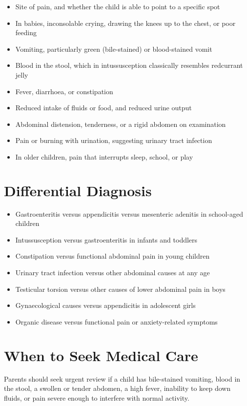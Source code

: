 \begin{itemize}
    \item Site of pain, and whether the child is able to point to a specific spot
    \item In babies, inconsolable crying, drawing the knees up to the chest, or poor feeding
    \item Vomiting, particularly green (bile-stained) or blood-stained vomit
    \item Blood in the stool, which in intussusception classically resembles redcurrant jelly
    \item Fever, diarrhoea, or constipation
    \item Reduced intake of fluids or food, and reduced urine output
    \item Abdominal distension, tenderness, or a rigid abdomen on examination
    \item Pain or burning with urination, suggesting urinary tract infection
    \item In older children, pain that interrupts sleep, school, or play
\end{itemize}

\section*{Differential Diagnosis}
\begin{itemize}
    \item Gastroenteritis versus appendicitis versus mesenteric adenitis in school-aged children
    \item Intussusception versus gastroenteritis in infants and toddlers
    \item Constipation versus functional abdominal pain in young children
    \item Urinary tract infection versus other abdominal causes at any age
    \item Testicular torsion versus other causes of lower abdominal pain in boys
    \item Gynaecological causes versus appendicitis in adolescent girls
    \item Organic disease versus functional pain or anxiety-related symptoms
\end{itemize}

\section*{When to Seek Medical Care}
Parents should seek urgent review if a child has bile-stained vomiting, blood in the stool, a swollen or tender abdomen, a high fever, inability to keep down fluids, or pain severe enough to interfere with normal activity.

